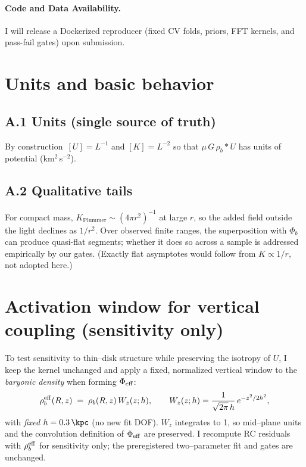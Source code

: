 		\paragraph{Code and Data Availability.}
		I will release a Dockerized reproducer (fixed CV folds, priors, FFT kernels, and pass-fail gates) upon submission.
		
		\appendix
		
		\section{Units and basic behavior}\label{app:units}
		\subsection*{A.1 Units (single source of truth)}
		By construction $\,[U]=L^{-1}$ and $[K]=L^{-2}$ so that $\mu\,G\,\rho_b*U$ has units of potential (km$^2$\,s$^{-2}$). 

		\subsection*{A.2 Qualitative tails}
		For compact mass, $K_{\text{Plummer}}\sim (4\pi r^2)^{-1}$ at large $r$, so the added field outside the light declines as $1/r^2$. Over observed finite ranges, the superposition with $\Phi_b$ can produce quasi-flat segments; whether it does so across a sample is addressed empirically by our gates. (Exactly flat asymptotes would follow from $K\!\propto\!1/r$, not adopted here.)
		
		\section{Activation window for vertical coupling (sensitivity only)}\label{app:thin}
		To test sensitivity to thin--disk structure while preserving the isotropy of $U$, I keep the kernel unchanged and apply a fixed, normalized vertical window to the \emph{baryonic density} when forming $\Phi_{\rm eff}$:
		\[
		\rho_b^{\rm eff}(R,z) \;=\; \rho_b(R,z)\,W_z(z;h),
		\qquad
		W_z(z;h)=\frac{1}{\sqrt{2\pi}\,h}\,e^{-z^2/2h^2},
		\]
		with \emph{fixed} $h=\SI{0.3}{\kpc}$ (no new fit DOF). $W_z$ integrates to 1, so mid--plane units and the convolution definition of $\Phi_{\rm eff}$ are preserved. I recompute RC residuals with $\rho_b^{\rm eff}$ for sensitivity only; the preregistered two--parameter fit and gates are unchanged.
